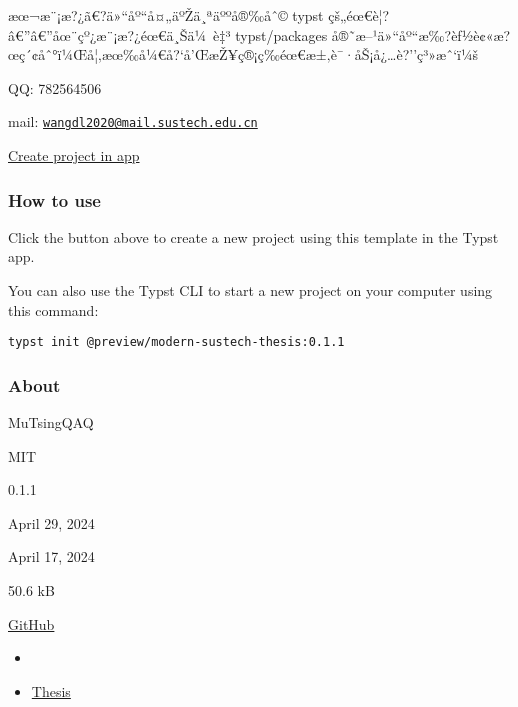 æœ¬æ¨¡æ?¿ã€?ä»``åº``å¤„äºŽä¸ªäººå®‰åˆ© typst
çš„éœ€è¦?â€''â€''åœ¨çº¿æ¨¡æ?¿éœ€ä¸Šä¼~è‡³ typst/packages
å®˜æ--¹ä»``åº``æ‰?èƒ½è¢«æ?œç´¢åˆ°ï¼Œå¦‚æœ‰å¼€å?{}`å'ŒæŽ¥ç®¡ç­‰éœ€æ±‚è¯·åŠ¡å¿\ldots è?''ç³»æˆ`ï¼š

QQ: 782564506

mail:
\href{mailto:wangdl2020@mail.sustech.edu.cn}{\nolinkurl{wangdl2020@mail.sustech.edu.cn}}

\href{/app?template=modern-sustech-thesis&version=0.1.1}{Create project
in app}

\subsubsection{How to use}\label{how-to-use}

Click the button above to create a new project using this template in
the Typst app.

You can also use the Typst CLI to start a new project on your computer
using this command:

\begin{verbatim}
typst init @preview/modern-sustech-thesis:0.1.1
\end{verbatim}



\subsubsection{About}\label{about}

\begin{description}
\tightlist
\item[Author :]
MuTsingQAQ
\item[License:]
MIT
\item[Current version:]
0.1.1
\item[Last updated:]
April 29, 2024
\item[First released:]
April 17, 2024
\item[Archive size:]
50.6 kB
\href{https://packages.typst.org/preview/modern-sustech-thesis-0.1.1.tar.gz}{\pandocbounded{}}
\item[Repository:]
\href{https://github.com/Duolei-Wang/sustech-thesis-typst}{GitHub}
\item[Categor y :]
\begin{itemize}
\tightlist
\item[]
\item
  \pandocbounded{}
  \href{https://typst.app/universe/search/?category=thesis}{Thesis}
\end{itemize}
\end{description}

